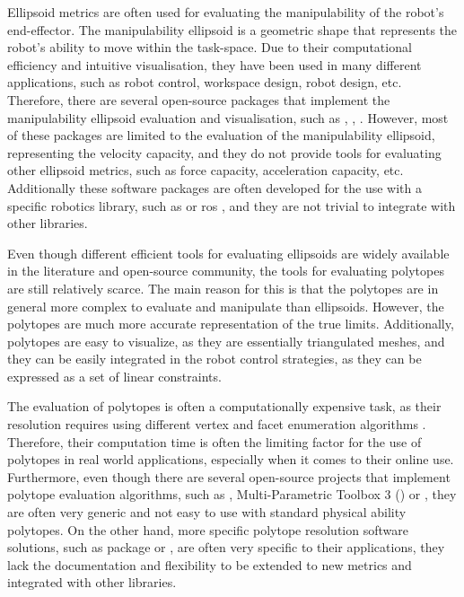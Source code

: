 Ellipsoid metrics are often used for evaluating the manipulability of the robot's end-effector. The manipulability ellipsoid is a geometric shape that represents the robot's ability to move within the task-space. Due to their computational efficiency and intuitive visualisation, they have been used in many different applications, such as robot control, workspace design, robot design, etc. Therefore, there are several 
open-source packages that implement the manipulability ellipsoid evaluation and visualisation, such as  \cite{Haviland2020Maximising},  \cite{manipulability_metrics},  \cite{manipulability}\cite{Jaquier2021Geometry}. However, most of these packages are limited to the evaluation of the manipulability ellipsoid, representing the velocity capacity, and they do not provide tools for evaluating other ellipsoid metrics, such 
as force capacity, acceleration capacity, etc. Additionally these software packages are often developed for the use with a specific robotics library, such as  \cite{rtb} or \gls{ros} \cite{ros}, and they are not trivial to integrate with other libraries.

Even though different efficient tools for evaluating ellipsoids are widely available in the literature and open-source community, the tools for evaluating polytopes are still relatively scarce. The main reason for this is that the polytopes are in general more complex to evaluate and manipulate than ellipsoids. However, the polytopes are much more accurate representation of the true limits. Additionally, polytopes are easy to visualize, as they are essentially triangulated meshes, and they can be easily integrated in the robot control strategies, as they can be expressed as a set of linear constraints. 

The evaluation of polytopes is often a computationally expensive task, as their resolution requires using different vertex and facet enumeration algorithms \cite{fukuda2004frequently}. Therefore, their computation time is often the limiting factor for the use of polytopes in real world applications, especially when it comes to their online use. Furthermore, even though there are several open-source projects that implement polytope evaluation algorithms, such as  \cite{pypoman}, Multi-Parametric Toolbox 3 () \cite{mpt3} or  \cite{cddlib}\cite{fukuda1997cdd}, they are often very generic and not easy to use with standard physical ability polytopes. On the other hand, more specific polytope resolution software solutions, such as  package \cite{Long2018Evaluating}\cite{long_constrained_2020} or  \cite{pygradientpolytope}, are often very specific to their applications, they lack the documentation and flexibility to be extended to new metrics and integrated with other libraries.

